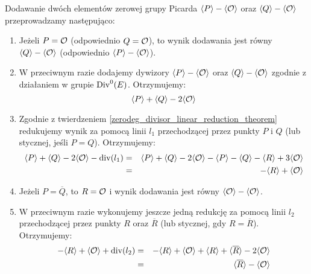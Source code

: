 \begin{fact}\label{piczero_addition_fact}
Dodawanie dwóch elementów zerowej grupy Picarda
$\langle P\rangle - \langle\mathcal{O}\rangle$ oraz $\langle Q\rangle - \langle\mathcal{O}\rangle$
przeprowadzamy następująco:
\begin{enumerate}
\item
Jeżeli $P = \mathcal{O}$ (odpowiednio $Q = \mathcal{O}$),
to wynik dodawania jest równy
$\langle Q\rangle - \langle\mathcal{O}\rangle$ (odpowiednio $\langle P\rangle - \langle\mathcal{O}\rangle$).
\item
W przeciwnym razie dodajemy dywizory
$\langle P\rangle - \langle\mathcal{O}\rangle$ oraz $\langle Q\rangle - \langle\mathcal{O}\rangle$
zgodnie z działaniem w grupie $\operatorname{Div}^0(E)$.
Otrzymujemy:
\begin{equation*}
\langle P\rangle + \langle Q\rangle - 2\langle\mathcal{O}\rangle
\end{equation*}
\item
Zgodnie z twierdzeniem \ref{zerodeg_divisor_linear_reduction_theorem}
redukujemy wynik za pomocą linii $l_1$ przechodzącej przez punkty $P$ i $Q$
(lub stycznej, jeśli $P = Q$).
Otrzymujemy:
\begin{eqnarray*}
\langle P\rangle + \langle Q\rangle - 2\langle\mathcal{O}\rangle - \operatorname{div}(l_1)
& = & \langle P\rangle + \langle Q\rangle - 2\langle\mathcal{O}\rangle
- \langle P\rangle - \langle Q\rangle - \langle R\rangle + 3\langle\mathcal{O}\rangle
\\ & = &
-\langle R\rangle + \langle\mathcal{O}\rangle
\end{eqnarray*}
\item
Jeżeli $P = \overline{Q}$,
to $R = \mathcal{O}$
i wynik dodawania jest równy $\langle\mathcal{O}\rangle - \langle\mathcal{O}\rangle$.
\item
W przeciwnym razie wykonujemy jeszcze jedną redukcję za pomocą linii $l_2$
przechodzącej przez punkty $R$ oraz $\overline{R}$
(lub stycznej, gdy $R = \overline{R}$).
Otrzymujemy:
\begin{eqnarray*}
-\langle R\rangle + \langle\mathcal{O}\rangle + \operatorname{div}(l_2)
& = & -\langle R\rangle + \langle\mathcal{O}\rangle
+ \langle R\rangle + \langle\overline{R}\rangle - 2\langle\mathcal{O}\rangle
\\ & = &
\langle\overline{R}\rangle - \langle\mathcal{O}\rangle
\end{eqnarray*}
\end{enumerate}
\end{fact}
